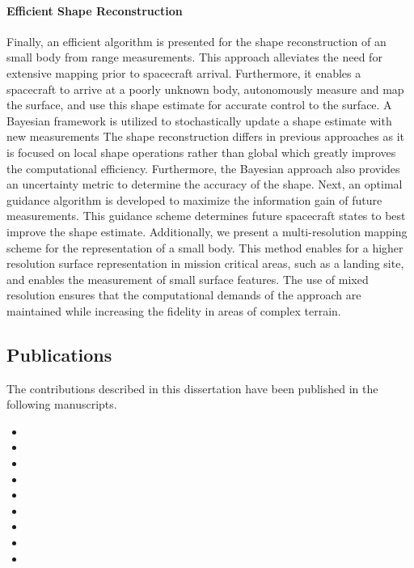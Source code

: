 \paragraph{Efficient Shape Reconstruction}
Finally, an efficient algorithm is presented for the shape reconstruction of an small body from range measurements. 
This approach alleviates the need for extensive mapping prior to spacecraft arrival. 
Furthermore, it enables a spacecraft to arrive at a poorly unknown body, autonomously measure and map the surface, and use this shape estimate for accurate control to the surface.
A Bayesian framework is utilized to stochastically update a shape estimate with new measurements
The shape reconstruction differs in previous approaches as it is focused on local shape operations rather than global which greatly improves the computational efficiency.
Furthermore, the Bayesian approach also provides an uncertainty metric to determine the accuracy of the shape.
Next, an optimal guidance algorithm is developed to maximize the information gain of future measurements.
This guidance scheme determines future spacecraft states to best improve the shape estimate. 
Additionally, we present a multi-resolution mapping scheme for the representation of a small body.
This method enables for a higher resolution surface representation in mission critical areas, such as a landing site, and enables the measurement of small surface features.
The use of mixed resolution ensures that the computational demands of the approach are maintained while increasing the fidelity in areas of complex terrain.

\subsection{Publications}

The contributions described in this dissertation have been published in the following manuscripts.


\begin{itemize}
    \item {}
    \item {}
    \item {}
    \item {}
    \item {}
    \item {}
    \item {}
    \item {}
    \item {}
\end{itemize}

